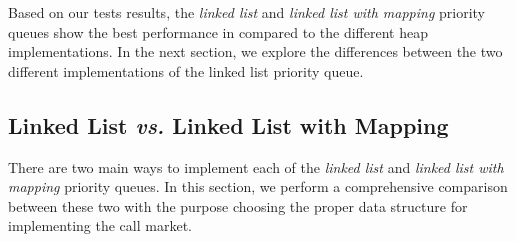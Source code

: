 
%
%






Based on our tests results, the \textit{linked list} and \textit{linked list with mapping} priority queues show the best performance in compared to the different heap implementations. In the next section, we explore the differences between the two different implementations of the linked list priority queue.


\subsection{Linked List \textit{vs.} Linked List with Mapping}

There are two main ways to implement each of the \textit{linked list} and \textit{linked list with mapping} priority queues. In this section, we perform a comprehensive comparison between these two with the purpose choosing the proper data structure for implementing the call market.

